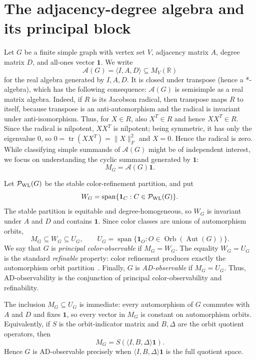 \documentclass[a4paper,fleqn]{cas-sc}
\theoremstyle{definition}
\theoremstyle{remark}
\newcommand{\R}{\mathbb R}
\newcommand{\one}{\mathbf 1}
\newcommand{\Aalg}{\mathcal A}
\newcommand{\Aut}{\operatorname{Aut}}
\newcommand{\Orb}{\operatorname{Orb}}
\newcommand{\tr}{\operatorname{tr}}
\newcommand{\Span}{\operatorname{span}}
\begin{document}
\section{The adjacency-degree algebra and its principal block}
\label{sec:algebra}

Let $G$ be a finite simple graph with vertex set $V$, adjacency matrix $A$, degree
matrix $D$, and all-ones vector $\one$.  We write
\[
        \Aalg(G)=\langle I,A,D\rangle\subseteq M_V(\R)
\]
for the real algebra generated by $I,A,D$.  It is closed under transpose (hence a *-algebra), which has the following consequence: $\Aalg(G)$ is semisimple as a real matrix
algebra.  Indeed, if $R$ is its Jacobson radical, then transpose maps $R$ to
itself, because transpose is an anti-automorphism and the radical is invariant
under anti-isomorphism.  Thus, for $X\in R$, also $X^T\in R$ and hence
$XX^T\in R$.  Since the radical is nilpotent, $XX^T$ is nilpotent; being symmetric,
it has only the eigenvalue $0$, so $0=\tr(XX^T)=\|X\|_F^2$ and $X=0$.  Hence the
radical is zero. While classifying simple
summands of $\Aalg(G)$ might be of independent interest, we focus on understanding the cyclic summand generated by $\one$:
\[
        M_G=\Aalg(G)\one.
\]

Let $\mathcal P_{\rm WL}(G)$ be the stable color-refinement partition, and put
\[
        W_G=\Span\{\one_C:C\in\mathcal P_{\rm WL}(G)\}.
\]
The stable partition is equitable and degree-homogeneous, so $W_G$ is invariant
under $A$ and $D$ and contains $\one$.  Since color classes are unions of
automorphism orbits,
\[
        M_G\subseteq W_G\subseteq U_G,
        \qquad
        U_G=\Span\{\one_O:O\in\Orb(\Aut(G))\}.
\]
We say that $G$ is \emph{principal color-observable} if $M_G=W_G$.  The
equality $W_G=U_G$ is the standard \emph{refinable} property: color refinement
produces exactly the automorphism orbit partition~\cite{ArvindKoblerRattanVerbitsky2017}.
Finally, $G$ is \emph{AD-observable} if $M_G=U_G$. Thus, AD-observability is the
conjunction of principal color-observability and refinability.  %

The inclusion $M_G\subseteq U_G$ is immediate: every automorphism of $G$ commutes
with $A$ and $D$ and fixes $\one$, so every vector in $M_G$ is constant on
automorphism orbits.  Equivalently, if $S$ is the orbit-indicator matrix and
$B,\Delta$ are the orbit quotient operators, then
\[
        M_G=S(\langle I,B,\Delta\rangle\one).
\]
Hence $G$ is AD-observable precisely when $\langle I,B,\Delta\rangle\one$ is the
full quotient space.
\end{document}

